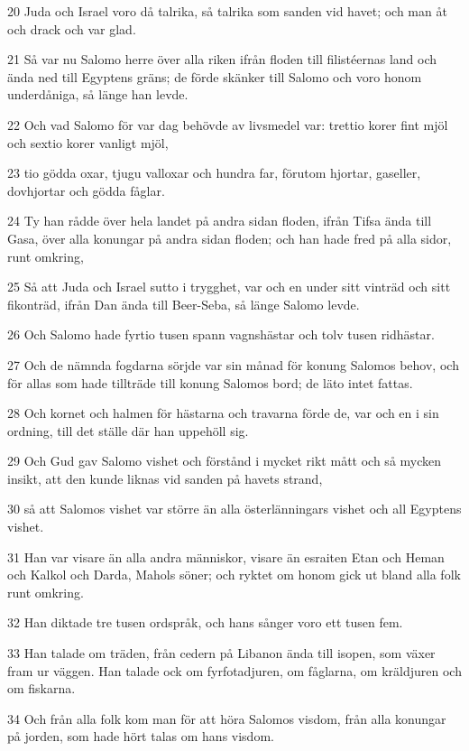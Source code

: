 \par 20 Juda och Israel voro då talrika, så talrika som sanden vid havet; och man åt och drack och var glad.
\par 21 Så var nu Salomo herre över alla riken ifrån floden till filistéernas land och ända ned till Egyptens gräns; de förde skänker till Salomo och voro honom underdåniga, så länge han levde.
\par 22 Och vad Salomo för var dag behövde av livsmedel var: trettio korer fint mjöl och sextio korer vanligt mjöl,
\par 23 tio gödda oxar, tjugu valloxar och hundra far, förutom hjortar, gaseller, dovhjortar och gödda fåglar.
\par 24 Ty han rådde över hela landet på andra sidan floden, ifrån Tifsa ända till Gasa, över alla konungar på andra sidan floden; och han hade fred på alla sidor, runt omkring,
\par 25 Så att Juda och Israel sutto i trygghet, var och en under sitt vinträd och sitt fikonträd, ifrån Dan ända till Beer-Seba, så länge Salomo levde.
\par 26 Och Salomo hade fyrtio tusen spann vagnshästar och tolv tusen ridhästar.
\par 27 Och de nämnda fogdarna sörjde var sin månad för konung Salomos behov, och för allas som hade tillträde till konung Salomos bord; de läto intet fattas.
\par 28 Och kornet och halmen för hästarna och travarna förde de, var och en i sin ordning, till det ställe där han uppehöll sig.
\par 29 Och Gud gav Salomo vishet och förstånd i mycket rikt mått och så mycken insikt, att den kunde liknas vid sanden på havets strand,
\par 30 så att Salomos vishet var större än alla österlänningars vishet och all Egyptens vishet.
\par 31 Han var visare än alla andra människor, visare än esraiten Etan och Heman och Kalkol och Darda, Mahols söner; och ryktet om honom gick ut bland alla folk runt omkring.
\par 32 Han diktade tre tusen ordspråk, och hans sånger voro ett tusen fem.
\par 33 Han talade om träden, från cedern på Libanon ända till isopen, som växer fram ur väggen. Han talade ock om fyrfotadjuren, om fåglarna, om kräldjuren och om fiskarna.
\par 34 Och från alla folk kom man för att höra Salomos visdom, från alla konungar på jorden, som hade hört talas om hans visdom.

